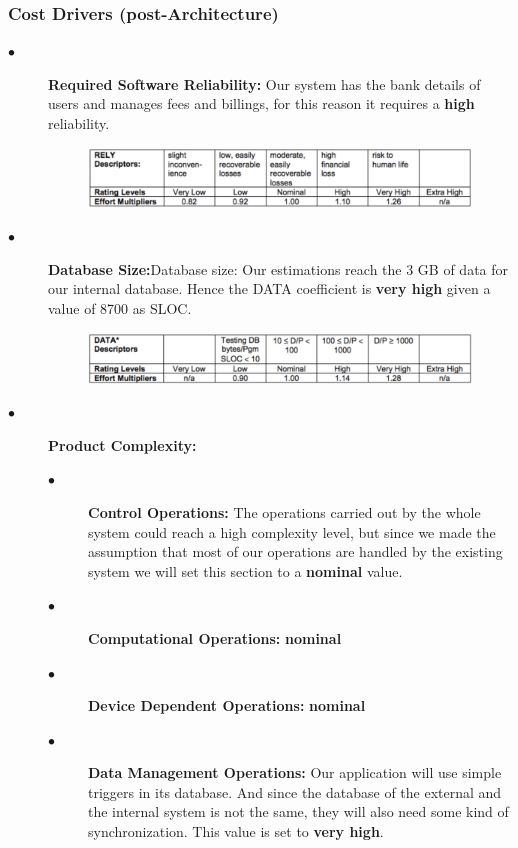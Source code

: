 \documentclass[a4paper,10pt]{article}
\begin{document}
  \subsubsection{Cost Drivers (post-Architecture)}
  \begin{description}
  \item[$\bullet$] \textbf{Required Software Reliability:} Our system has the bank details of users and manages fees and billings, for this reason it requires a \textbf{high} reliability.
        \begin{figure}[h]
  \centering
    \includegraphics[scale=0.32]{Resources/cocomo/rely.png}
  \end{figure}
  \item[$\bullet$] \textbf{Database Size:}Database size: Our estimations reach the 3 GB of data for our internal database.  Hence the DATA coefficient is \textbf{very high} given a value of 8700 as SLOC.
          \begin{figure}[h]
  \centering
    \includegraphics[scale=0.32]{Resources/cocomo/data.png}
  \end{figure}\FloatBarrier
  \item[$\bullet$] \textbf{Product Complexity:} 
     \begin{description}
    \item[$\bullet$] \textbf{Control Operations: } The operations carried out by the whole system could reach a high complexity level, but since we made the assumption that most of our operations are handled by the existing system we will set this section to a \textbf{nominal} value.
    \item[$\bullet$] \textbf{Computational Operations: } \textbf{nominal}
    \item[$\bullet$] \textbf{Device Dependent Operations: } \textbf{nominal}
    \item[$\bullet$] \textbf{Data Management Operations: } Our application will use simple triggers in its database. And since the database of the external and the internal system is not the same, they will also need some kind of synchronization. This value is set to \textbf{very high}.

\end{description}
\end{description}
\end{document}
